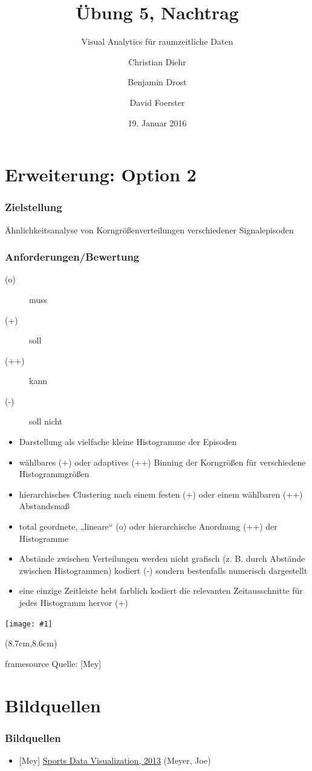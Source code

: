 \documentclass{beamer}
\title{Übung 5, Nachtrag}
\subtitle{Visual Analytics für raumzeitliche Daten}
\author{Christian Diehr \and Benjamin Drost \and David Foerster}
\institute{Institut für Informatik\\Humboldt-Universität zu Berlin}
\date{19. Januar 2016}
\newcommand{\wholeslidegraphics}[1]{
	\begin{center}
		\texttt{[image: \#1]}
	\end{center}
}
\newcommand{\graphicssource}[1]{
	\begin{textblock*}{4cm}(8.7cm,8.6cm)
		\begin{beamercolorbox}[ht=0.5cm,right]{framesource}
				\usebeamerfont{framesource}\usebeamercolor[fg]{framesource} Quelle: {#1}
		\end{beamercolorbox}
	\end{textblock*}
}
\begin{document}
\begin{frame}
		\titlepage
\end{frame}
\logo %

\section{Erweiterung: Option 2}
\begin{frame}
	\frametitle{Zielstellung}
	\begin{center}
		\Large
		Ähnlichkeitsanalyse von Korngrößenverteilungen verschiedener Signalepisoden
	\end{center}
\end{frame}

\begin{frame}
	\frametitle{Anforderungen/Bewertung}
	\begin{description}
		\item[(o)] muss
		\item[(+)] soll
		\item[(++)] kann
		\item[(-)] soll nicht
	\end{description}
\end{frame}

\begin{frame}
	\begin{itemize}
		\setlength\itemsep{1em}
		\item Darstellung als vielfache kleine Histogramme der Episoden
		\item wählbares (+) oder adaptives (++) Binning der Korngrößen für verschiedene Histogrammgrößen
    \item hierarchisches Clustering nach einem festen (+) oder einem wählbaren (++) Abstandsmaß
    \item total geordnete, „lineare“ (o) oder hierarchische Anordnung (++) der Histogramme
    \item Abstände zwischen Verteilungen werden nicht grafisch (z. B. durch Abstände zwischen Histogrammen) kodiert (-) sondern bestenfalls numerisch dargestellt
    \item eine einzige Zeitleiste hebt farblich kodiert die relevanten Zeitausschnitte für jedes Histogramm hervor (+)
	\end{itemize}
\end{frame}
\begin{frame}
	\wholeslidegraphics{histogram-small-multiples}
	\graphicssource{[Mey]}
\end{frame}

\section{Bildquellen}
\begin{frame}
	\frametitle{Bildquellen}
	\begin{itemize}
		\item{[Mey] \href{http://viz.sdql.com/2014/10/31/small-multiples-starters-innings-pitched-for-each-mlb-teams-in-2013/}{Sports Data Visualization, 2013} (Meyer, Joe)}
	\end{itemize}
\end{frame}
\end{document}
